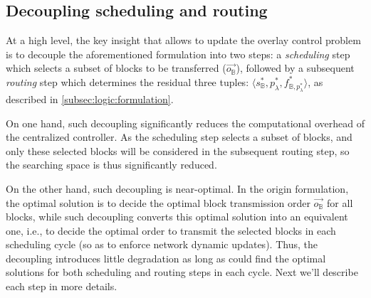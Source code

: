 

\subsection{Decoupling scheduling and routing}
\label{subsec:logic:separation}

At a high level, the key insight that allows \name to update the overlay control problem is
to decouple the aforementioned formulation into two steps:
a {\em scheduling} step which selects a subset of blocks to be transferred
($\overrightarrow{o_\mathbb{B}}$), followed by a subsequent {\em routing}
step which determines the residual three tuples: $\langle s_{\mathbb{B}}^*, p_{\lambda}^*, f^*_{\mathbb{B},p_{\lambda}^*} \rangle$, as described in \Section\ref{subsec:logic:formulation}. %

On one hand, such decoupling significantly reduces the computational overhead of the centralized controller. As the scheduling step selects a subset of blocks, and only these selected blocks will be considered in the subsequent routing step, so the searching space is thus significantly reduced.

On the other hand, such decoupling is near-optimal. In the origin formulation, the optimal solution is to decide the optimal block transmission order $\overrightarrow{o_\mathbb{B}}$ for all blocks, while such decoupling converts this optimal solution into an equivalent one, i.e., to decide the optimal order to transmit the selected blocks in each scheduling cycle (so as to enforce network dynamic updates). Thus, the decoupling introduces little degradation as long as \name could find the optimal solutions for both scheduling and routing steps in each cycle. Next we'll describe each step in more details.

